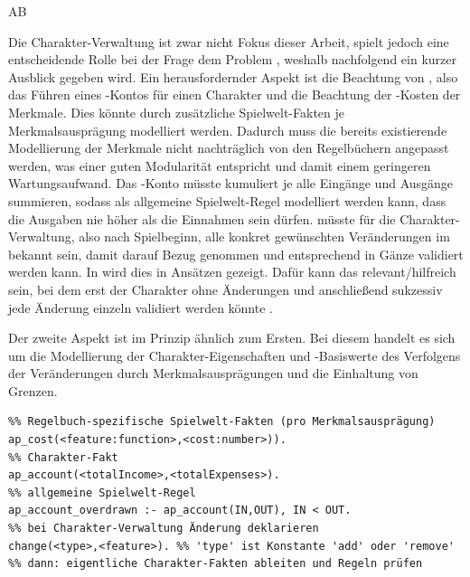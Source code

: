 \begin{enumerateWithCode}{AB}
    \item\label{itm:D.CharakterVerwaltung} Die Charakter-Verwaltung ist zwar nicht Fokus dieser Arbeit, spielt jedoch eine entscheidende Rolle bei der Frage \bzw dem Problem , weshalb nachfolgend ein kurzer Ausblick gegeben wird.
    Ein herausfordernder Aspekt ist die Beachtung von , also das Führen eines -Kontos für einen Charakter und die Beachtung der -Kosten der Merkmale.
    Dies könnte durch zusätzliche Spielwelt-Fakten je Merkmalsausprägung modelliert werden.
    Dadurch muss die bereits existierende Modellierung der Merkmale nicht nachträglich von den Regelbüchern angepasst werden, was einer guten Modularität entspricht und damit einem geringeren Wartungsaufwand.
    Das -Konto müsste kumuliert je alle Eingänge und Ausgänge summieren, sodass als allgemeine Spielwelt-Regel modelliert werden kann, dass die Ausgaben nie höher als die Einnahmen sein dürfen.
    \Insb müsste für die Charakter-Verwaltung, also nach Spielbeginn, alle konkret gewünschten Veränderungen im  bekannt sein, damit darauf Bezug genommen und entsprechend in Gänze validiert werden kann.
    In  wird dies in Ansätzen gezeigt.
    Dafür kann \ggf das  relevant/hilfreich sein, bei dem erst der Charakter ohne Änderungen und anschließend sukzessiv jede Änderung einzeln validiert werden könnte .

    Der zweite Aspekt ist im Prinzip ähnlich zum Ersten.
    Bei diesem handelt es sich um die Modellierung der Charakter-Eigenschaften und -Basiswerte \inkl des Verfolgens der Veränderungen durch Merkmalsausprägungen und die Einhaltung von Grenzen.

    \begin{listing}[htbp]
        \caption{Grob-Formalisierung von }\label{lst:grob-formalisierung-von-ap}
        \begin{verbatim}
%% Regelbuch-spezifische Spielwelt-Fakten (pro Merkmalsausprägung)
ap_cost(<feature:function>,<cost:number>)).
%% Charakter-Fakt
ap_account(<totalIncome>,<totalExpenses>).
%% allgemeine Spielwelt-Regel
ap_account_overdrawn :- ap_account(IN,OUT), IN < OUT.
%% bei Charakter-Verwaltung Änderung deklarieren
change(<type>,<feature>). %% 'type' ist Konstante 'add' oder 'remove'
%% dann: eigentliche Charakter-Fakten ableiten und Regeln prüfen
        \end{verbatim}
    \end{listing}
\end{enumerateWithCode}